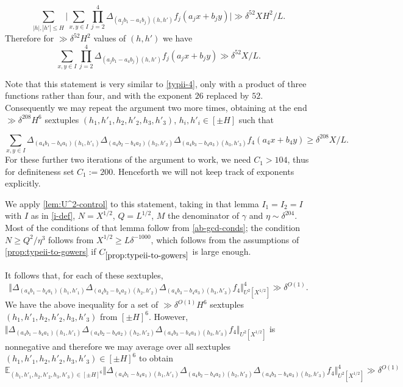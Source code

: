 \documentclass[11pt,reqno]{amsart}
\numberwithin{equation}{section}
\theoremstyle{definition}
\theoremstyle{remark}
\newcommand{\mb}{\mathbb}
\renewcommand{\le}{\leqslant}
\renewcommand{\ge}{\geqslant}
\newcommand\E{\mb{E}}
\begin{document}
\[ \sum_{|h|, |h'| \le H} \Big| \sum_{x, y \in I} \prod_{j=2}^4 \Delta_{(a_j b_1 - a_1 b_j) (h, h')} f_j(a_j x + b_j y)  \Big| \gg \delta^{52} XH^2/L.
\]
Therefore for $\gg \delta^{52} H^2$ values of $(h,h')$ we have 
\[ \sum_{x, y \in I} \prod_{j=2}^4 \Delta_{(a_j b_1 - a_4b_j) (h,h')} f_j(a_j x + b_j y)   \gg \delta^{52} X/L.\]

Note that this statement is very similar to \cref{typii-4}, only with a product of three functions rather than four, and with the exponent $26$ replaced by $52$. Consequently we may repeat the argument two more times, obtaining at the end $\gg \delta^{208} H^6$ sextuples $(h_1,h'_1, h_2,h'_2,h_3,h'_3)$, $h_i, h'_i \in [\pm H]$ such that 

\[\sum_{x,y \in I}\Delta_{(a_4b_1-b_4a_1)(h_1,h'_1)}\Delta_{(a_4b_2-b_4a_2)(h_2,h'_2)}\Delta_{(a_4b_3-b_4a_3)(h_3,h'_3)}f_4(a_4x + b_4y) \ge \delta^{208} X/L.\] For these further two iterations of the argument to work, we need $C_1 > 104$, thus for definiteness set $C_1 := 200$. Henceforth we will not keep track of exponents explicitly.

We apply \cref{lem:U^2-control} to this statement, taking in that lemma $I_1 = I_2 = I$ with $I$ as in \cref{i-def}, $N = X^{1/2}$, $Q = L^{1/2}$, $M$ the denominator of $\gamma$ and $\eta \sim \delta^{204}$. Most of the conditions of that lemma follow from \cref{ab-gcd-conds}; the condition $N \ge Q^2/\eta^3$ follows from $X^{1/2} \ge L \delta^{-1000}$, which follows from the assumptions of \cref{prop:typeii-to-gowers} if $C_{\ref{prop:typeii-to-gowers}}$ is large enough. 

It follows that, for each of these sextuples, 
\[ \Vert \Delta_{(a_4b_1-b_4a_1)(h_1,h'_1)}\Delta_{(a_4b_2-b_4a_2)(h_2,h'_2)}\Delta_{(a_4b_3-b_4a_3)(h_3,h'_3)}f_4 \Vert_{U^2[X^{1/2}]}^{4} \gg \delta^{O(1)}.\] 
We have the above inequality for a set of $\gg \delta^{O(1)} H^6$ sextuples $(h_1,h'_1 ,h_2,h'_2, h_3,h'_3)$ from $[\pm H]^6$. However, $\Vert \Delta_{(a_4b_1-b_4a_1)(h_1,h'_1)}\Delta_{(a_4b_2-b_4a_2)(h_2,h'_2)}\Delta_{(a_4b_3-b_4a_3)(h_3,h'_3)}f_4 \Vert_{U^2[X^{1/2}]}$ is nonnegative and therefore we may average over all sextuples $(h_1,h'_1 ,h_2,h'_2, h_3,h'_3) \in [\pm H]^6$ to obtain 
\[\E_{(h_1,h'_1 ,h_2,h'_2, h_3,h'_3)\in[\pm H]^6} \Vert \Delta_{(a_4b_1-b_4a_1)(h_1,h'_1)}\Delta_{(a_4b_2-b_4a_2)(h_2,h'_2)}\Delta_{(a_4b_3-b_4a_3)(h_3,h'_3)}f_4 \Vert_{U^2[X^{1/2}]}^{4} \gg \delta^{O(1)}\]
\end{document}
